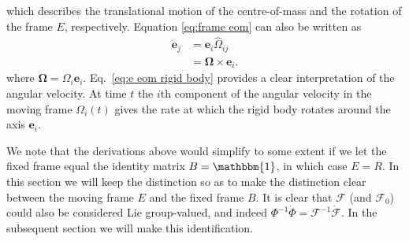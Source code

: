 which describes the translational motion of the centre-of-mass and the rotation of the frame $E$, respectively. Equation \ref{eq:frame eom} can also be written as
\begin{equation} \label{eq:e eom rigid body}
\begin{aligned}
\dot{\mathbf{e}}_j & = \mathbf{e}_i \hat{\Omega}_{ij} \\
& = \boldsymbol{\Omega} \times \mathbf{e}_i.
\end{aligned} 
\end{equation}
where $\boldsymbol{\Omega} = \Omega_i \mathbf{e}_i$. Eq.~\ref{eq:e eom rigid body} provides a clear interpretation of the angular velocity. At time $t$ the $i$th component of the angular velocity  in the moving frame $\Omega_i(t)$ gives the rate at which the rigid body rotates around the axis $\mathbf{e}_i$.

We note that the derivations above would simplify to some extent if we let the fixed frame equal the identity matrix $B=\mathbbm{1}$, in which case $E = R$. In this section we will keep the distinction so as to make the distinction clear between the moving frame $E$ and the fixed frame $B$. It is clear that $\mathcal{F}$ (and $\mathcal{F}_0$) could also be considered Lie group-valued, and indeed $\Phi^{-1} \dot{\Phi} = \mathcal{F}^{-1} \dot{\mathcal{F}}$. In the subsequent section we will make this identification.

